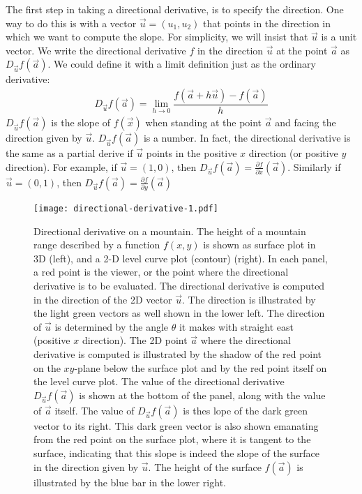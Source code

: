 \documentclass[conference,final,11pt,technote,onecolumn]{IEEEtran}\usepackage[]{graphicx}\usepackage[]{color}
\begin{document}
The first step in taking a directional derivative, is to specify the direction. One way to do this is with a vector $\vec u=(u_1,u_2)$ that points in the direction in which we want to compute the slope. For simplicity, we will insist that $\vec u$ is a unit vector. We write the directional derivative $f$ in the direction $\vec u$ at the point $\vec a$ as $D_{\vec u}f(\vec a)$. We could define it with a limit definition just as the ordinary derivative:
\begin{eqnarray}
D_{\vec u}f(\vec a) = \lim_{h\rightarrow 0}\dfrac{f(\vec a+h\vec u)-f(\vec a)}{h}\label{eqn:directional_derivative_definition_1}
\end{eqnarray}
$D_{\vec u}f(\vec a)$ is the slope of $f(\vec x)$ when standing at the point $\vec a$ and facing the direction given by $\vec u$. $D_{\vec u}f(\vec a)$ is a number. In fact, the directional derivative is the same as a partial derive if $\vec u$ points in the positive $x$ direction (or positive $y$ direction). For example, if $\vec u=(1,0)$, then $D_{\vec u}f(\vec a) = \frac{\partial f}{\partial x}(\vec a)$. Similarly if $\vec u=(0,1)$, then $D_{\vec u}f(\vec a) = \frac{\partial f}{\partial y}(\vec a)$
\begin{figure}[!h]
\centering
\texttt{[image: directional-derivative-1.pdf]}
\caption{\label{fig:directional_derivative_1}Directional derivative on a mountain\cite{mathInsight:DirectionalDerivative}. The height of a mountain range described by a function $f(x,y)$ is shown as surface plot in 3D (left), and a 2-D level curve plot (contour) (right). In each panel, a red point is the viewer, or the point where the directional derivative is to be evaluated. The directional derivative is computed in the direction of the 2D vector $\vec u$. The direction is illustrated by the light green vectors as well shown in the lower left. The direction of $\vec u$ is determined by the angle $\theta$ it makes with straight east (positive $x$ direction). The 2D point $\vec a$ where the directional derivative is computed is illustrated by the shadow of the red point on the $xy$-plane below the surface plot and by the red point itself on the level curve plot. The value of the directional derivative $D_{\vec u}f(\vec a)$ is shown at the bottom of the panel, along with the value of $\vec a$ itself. The value of $D_{\vec u}f(\vec a)$ is thes lope of the dark green vector to its right. This dark green vector is also shown emanating from the red point on the surface plot, where it is tangent to the surface, indicating that this slope is indeed the slope of the surface in the direction given by $\vec u$. The height of the surface $f(\vec a)$ is illustrated by the blue bar in the lower right.}
\end{figure}
\end{document}
